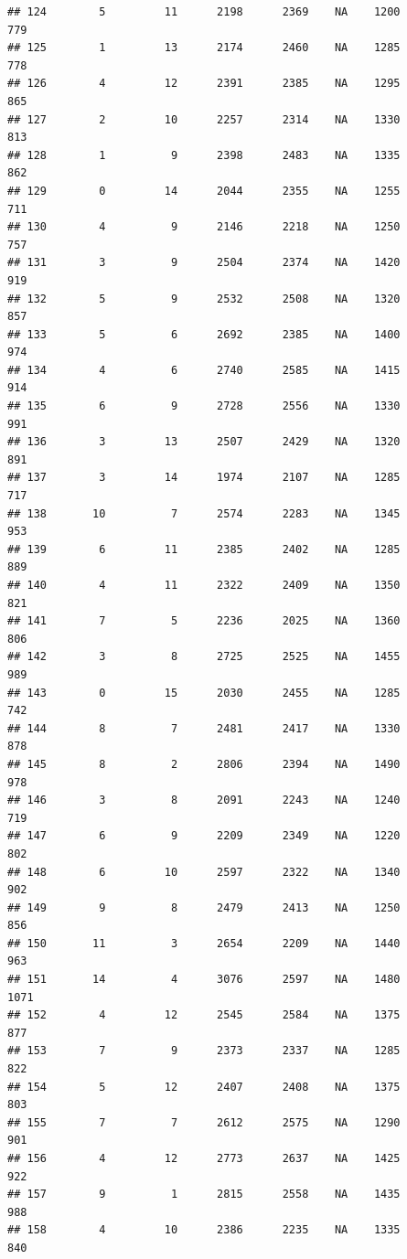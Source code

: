 \documentclass[]{book}
\begin{document}
\begin{verbatim}
## 124        5         11      2198      2369    NA    1200            779
## 125        1         13      2174      2460    NA    1285            778
## 126        4         12      2391      2385    NA    1295            865
## 127        2         10      2257      2314    NA    1330            813
## 128        1          9      2398      2483    NA    1335            862
## 129        0         14      2044      2355    NA    1255            711
## 130        4          9      2146      2218    NA    1250            757
## 131        3          9      2504      2374    NA    1420            919
## 132        5          9      2532      2508    NA    1320            857
## 133        5          6      2692      2385    NA    1400            974
## 134        4          6      2740      2585    NA    1415            914
## 135        6          9      2728      2556    NA    1330            991
## 136        3         13      2507      2429    NA    1320            891
## 137        3         14      1974      2107    NA    1285            717
## 138       10          7      2574      2283    NA    1345            953
## 139        6         11      2385      2402    NA    1285            889
## 140        4         11      2322      2409    NA    1350            821
## 141        7          5      2236      2025    NA    1360            806
## 142        3          8      2725      2525    NA    1455            989
## 143        0         15      2030      2455    NA    1285            742
## 144        8          7      2481      2417    NA    1330            878
## 145        8          2      2806      2394    NA    1490            978
## 146        3          8      2091      2243    NA    1240            719
## 147        6          9      2209      2349    NA    1220            802
## 148        6         10      2597      2322    NA    1340            902
## 149        9          8      2479      2413    NA    1250            856
## 150       11          3      2654      2209    NA    1440            963
## 151       14          4      3076      2597    NA    1480           1071
## 152        4         12      2545      2584    NA    1375            877
## 153        7          9      2373      2337    NA    1285            822
## 154        5         12      2407      2408    NA    1375            803
## 155        7          7      2612      2575    NA    1290            901
## 156        4         12      2773      2637    NA    1425            922
## 157        9          1      2815      2558    NA    1435            988
## 158        4         10      2386      2235    NA    1335            840

\end{verbatim}
\end{document}
